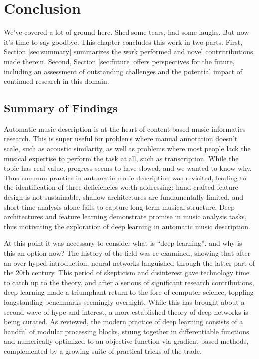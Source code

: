 \graphicspath{{8/figures/}}
\chapter{Conclusion}
\label{chp:conclusion}

We've covered a lot of ground here.
Shed some tears, had some laughs.
But now it's time to say goodbye.
This chapter concludes this work in two parts.
First, Section \ref{sec:summary} summarizes the work performed and novel contritributions made therein.
Second, Section \ref{sec:future} offers perspectives for the future, including an assessment of outstanding challenges and the potential impact of continued research in this domain.

\section{Summary of Findings}

Automatic music description is at the heart of content-based music informatics research.
This is super useful for problems where manual annotation doesn't scale, such as acoustic similarity, as well as problems where most people lack the musical expertise to perform the task at all, such as transcription.
While the topic has real value, progress seems to have slowed, and we wanted to know why.
Thus common practice in automatic music description was revisited, leading to the identification of three deficiencies worth addressing: hand-crafted feature design is not sustainable, shallow architectures are fundamentally limited, and short-time analysis alone fails to capture long-term musical structure.
Deep architectures and feature learning demonstrate promise in music analysis tasks, thus motivating the exploration of deep learning in automatic music description.

At this point it was necessary to consider what is ``deep learning'', and why is this an option now?
The history of the field was re-examined, showing that after an over-hyped introduction, neural networks languished through the latter part of the 20th century.
This period of skepticism and disinterest gave technology time to catch up to the theory, and after a serious of significant research contributions, deep learning made a triumphant return to the fore of computer science, toppling longstanding benchmarks seemingly overnight.
While this has brought about a second wave of hype and interest, a more established theory of deep networks is being curated.
As reviewed, the modern practice of deep learning consists of a handful of modular processing blocks, strung together in differentiable functions and numerically optimized to an objective function via gradient-based methods, complemented by a growing suite of practical tricks of the trade.

